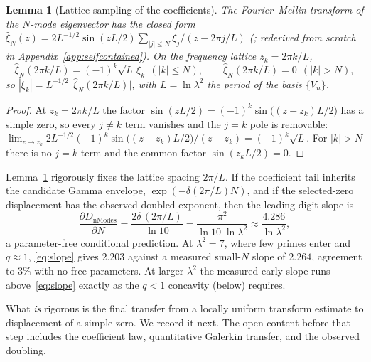 \documentclass[11pt,a4paper]{article}
\newtheorem{lemma}{Lemma}
\begin{document}
\begin{lemma}[Lattice sampling of the coefficients]\label{lem:sampling}
The Fourier--Mellin transform of the $N$-mode eigenvector has the closed
form $\widehat\xi_N(z)=2L^{-1/2}\sin(zL/2)\sum_{|j|\le N}\xi_j/(z-2\pi j/L)$
(\cite[Prop.~5.9]{CCM2025}; rederived from scratch in
Appendix~\ref{app:selfcontained}). On the frequency lattice $z_k=2\pi k/L$,
\[
  \widehat\xi_N(2\pi k/L)=(-1)^k\sqrt{L}\,\xi_k\ \ (|k|\le N),\qquad
  \widehat\xi_N(2\pi k/L)=0\ \ (|k|>N),
\]
so $|\xi_k|=L^{-1/2}\,\bigl|\widehat\xi_N(2\pi k/L)\bigr|$, with
$L=\ln\lambda^2$ the period of the basis $\{V_n\}$.
\end{lemma}
\begin{proof}
At $z_k=2\pi k/L$ the factor $\sin(zL/2)=(-1)^k\sin\!\bigl((z-z_k)L/2\bigr)$
has a simple zero, so every $j\ne k$ term vanishes and the $j=k$ pole is
removable:
$\lim_{z\to z_k}2L^{-1/2}(-1)^k\sin\!\bigl((z-z_k)L/2\bigr)/(z-z_k)
=(-1)^k\sqrt{L}$. For $|k|>N$ there is no $j=k$ term and the common factor
$\sin(z_kL/2)=0$.
\end{proof}

Lemma~\ref{lem:sampling} rigorously fixes the lattice spacing $2\pi/L$. If the
coefficient tail inherits the candidate Gamma envelope,
$\exp(-\delta(2\pi/L)N)$, and if the selected-zero displacement has the
observed doubled exponent, then the leading digit slope is
\begin{equation}\label{eq:slope}
  \frac{\partial D_{\mathrm{nModes}}}{\partial N}
  =\frac{2\delta\,(2\pi/L)}{\ln10}=\frac{\pi^2}{\ln10\;\ln\lambda^2}
  \approx\frac{4.286}{\ln\lambda^2},
\end{equation}
a parameter-free conditional prediction. At $\lambda^2=7$, where few primes enter and
$q\approx1$, \eqref{eq:slope} gives $2.203$ against a measured small-$N$ slope
of $2.264$, agreement to $3\%$ with no free parameters. At larger $\lambda^2$
the measured early slope runs above~\eqref{eq:slope} exactly as the $q<1$
concavity (below) requires.

What \emph{is} rigorous is the final transfer from a locally uniform transform
estimate to displacement of a simple zero. We record it next. The open content
before that step includes the coefficient law, quantitative Galerkin transfer,
and the observed doubling.
\end{document}
